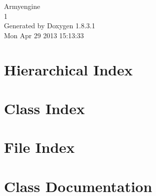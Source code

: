 \documentclass{book}
\begin{document}
\hypersetup{pageanchor=false,citecolor=blue}
\begin{titlepage}
\vspace*{7cm}
\begin{center}
{\Large Armyengine \\[1ex]\large 1 }\\
\vspace*{1cm}
{\large Generated by Doxygen 1.8.3.1}\\
\vspace*{0.5cm}
{\small Mon Apr 29 2013 15:13:33}\\
\end{center}
\end{titlepage}
\clearemptydoublepage
{}
\tableofcontents
\clearemptydoublepage
{}
\hypersetup{pageanchor=true,citecolor=blue}
\chapter{Hierarchical Index}

\chapter{Class Index}

\chapter{File Index}

\chapter{Class Documentation}


































\end{document}
